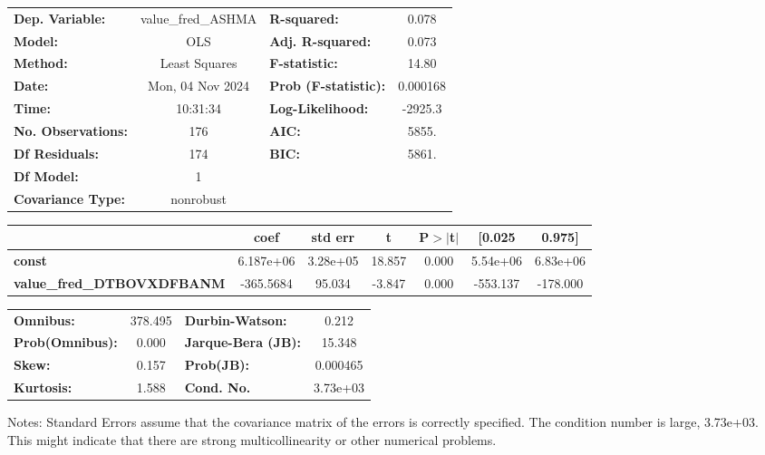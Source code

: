 \begin{center}
\begin{tabular}{lclc}
\toprule
\textbf{Dep. Variable:}            & value\_fred\_ASHMA & \textbf{  R-squared:         } &     0.078   \\
\textbf{Model:}                    &        OLS         & \textbf{  Adj. R-squared:    } &     0.073   \\
\textbf{Method:}                   &   Least Squares    & \textbf{  F-statistic:       } &     14.80   \\
\textbf{Date:}                     &  Mon, 04 Nov 2024  & \textbf{  Prob (F-statistic):} &  0.000168   \\
\textbf{Time:}                     &      10:31:34      & \textbf{  Log-Likelihood:    } &   -2925.3   \\
\textbf{No. Observations:}         &          176       & \textbf{  AIC:               } &     5855.   \\
\textbf{Df Residuals:}             &          174       & \textbf{  BIC:               } &     5861.   \\
\textbf{Df Model:}                 &            1       & \textbf{                     } &             \\
\textbf{Covariance Type:}          &     nonrobust      & \textbf{                     } &             \\
\bottomrule
\end{tabular}
\begin{tabular}{lcccccc}
                                   & \textbf{coef} & \textbf{std err} & \textbf{t} & \textbf{P$> |$t$|$} & \textbf{[0.025} & \textbf{0.975]}  \\
\midrule
\textbf{const}                     &    6.187e+06  &     3.28e+05     &    18.857  &         0.000        &     5.54e+06    &     6.83e+06     \\
\textbf{value\_fred\_DTBOVXDFBANM} &    -365.5684  &       95.034     &    -3.847  &         0.000        &     -553.137    &     -178.000     \\
\bottomrule
\end{tabular}
\begin{tabular}{lclc}
\textbf{Omnibus:}       & 378.495 & \textbf{  Durbin-Watson:     } &    0.212  \\
\textbf{Prob(Omnibus):} &   0.000 & \textbf{  Jarque-Bera (JB):  } &   15.348  \\
\textbf{Skew:}          &   0.157 & \textbf{  Prob(JB):          } & 0.000465  \\
\textbf{Kurtosis:}      &   1.588 & \textbf{  Cond. No.          } & 3.73e+03  \\
\bottomrule
\end{tabular}
\end{center}

Notes: \newline
 [1] Standard Errors assume that the covariance matrix of the errors is correctly specified. \newline
 [2] The condition number is large, 3.73e+03. This might indicate that there are \newline
 strong multicollinearity or other numerical problems.